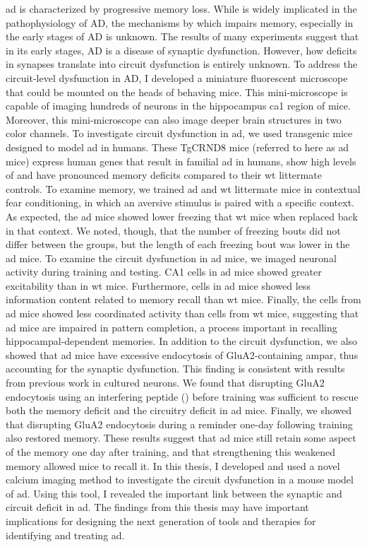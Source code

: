 \Gls{ad} is characterized by progressive memory loss. While \abeta{} is widely implicated in the pathophysiology of AD, the mechanisms by which \abeta{} impairs memory, especially in the early stages of AD is unknown. The results of many experiments suggest that in its early stages, AD is a disease of synaptic dysfunction. However, how deficits in synapses translate into circuit dysfunction is entirely unknown. To address the circuit-level dysfunction in AD, I developed a miniature fluorescent microscope that could be mounted on the heads of behaving mice. This mini-microscope is capable of imaging hundreds of neurons in the hippocampus \gls{ca1} region of mice. Moreover, this mini-microscope can also image deeper brain structures in two color channels. 
To investigate circuit dysfunction in \gls{ad}, we used transgenic mice designed to model \gls{ad} in humans. These TgCRND8 mice (referred to here as \gls{ad} mice) express human genes that result in familial \gls{ad} in humans, show high levels of \abeta{} and have pronounced memory deficits compared to their \gls{wt} littermate controls. To examine memory, we trained \gls{ad} and \gls{wt} littermate mice in contextual fear conditioning, in which an aversive stimulus is paired with a specific context. As expected, the \gls{ad} mice showed lower freezing that \gls{wt} mice when replaced back in that context. We noted, though, that the number of freezing bouts did not differ between the groups, but the length of each freezing bout was lower in the \gls{ad} mice. To examine the circuit dysfunction in \gls{ad} mice, we imaged neuronal activity during training and testing. CA1 cells in \gls{ad} mice showed greater excitability than in \gls{wt} mice. Furthermore, cells in \gls{ad} mice showed less information content related to memory recall than \gls{wt} mice. Finally, the cells from \gls{ad} mice showed less coordinated activity than cells from \gls{wt} mice, suggesting that \gls{ad} mice are impaired in pattern completion, a process important in recalling hippocampal-dependent memories.
In addition to the circuit dysfunction, we also showed that \gls{ad} mice have excessive endocytosis of GluA2-containing \gls{ampar}, thus accounting for the synaptic dysfunction. This finding is consistent with results from previous work in cultured neurons. We found that disrupting GluA2 endocytosis using an interfering peptide (\tglu{}) before training was sufficient to rescue both the memory deficit and the circuitry deficit in \gls{ad} mice. Finally, we showed that disrupting GluA2 endocytosis during a reminder one-day following training also restored memory. These results suggest that \gls{ad} mice still retain some aspect of the memory one day after training, and that strengthening this weakened memory allowed mice to recall it.
In this thesis, I developed and used a novel calcium imaging method to investigate the circuit dysfunction in a mouse model of \gls{ad}. Using this tool, I revealed the important link between the synaptic and circuit deficit in \gls{ad}. The findings from this thesis may have important implications for designing the next generation of tools and therapies for identifying and treating \gls{ad}.
